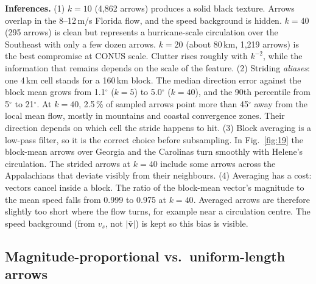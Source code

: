 \textbf{Inferences.}
(1) $k=10$ (4,862 arrows) produces a solid black texture. Arrows overlap in the 8--12\,m/s Florida flow, and the speed
background is hidden. $k=40$ (295 arrows) is clean but represents a hurricane-scale circulation over the Southeast with
only a few dozen arrows. $k=20$ (about 80\,km, 1,219 arrows) is the best compromise at CONUS scale. Clutter rises roughly
with $k^{-2}$, while the information that remains depends on the scale of the feature.
(2) Striding \emph{aliases}: one 4\,km cell stands for a 160\,km block. The median direction error against the block mean
grows from 1.1$^\circ$ ($k=5$) to 5.0$^\circ$ ($k=40$), and the 90th percentile from 5$^\circ$ to 21$^\circ$. At $k=40$,
2.5\,\% of sampled arrows point more than 45$^\circ$ away from the local mean flow, mostly in mountains and coastal
convergence zones. Their direction depends on which cell the stride happens to hit.
(3) Block averaging is a low-pass filter, so it is the correct choice before subsampling. In Fig.~\ref{fig:19} the
block-mean arrows over Georgia and the Carolinas turn smoothly with Helene's circulation. The strided arrows at $k=40$
include some arrows across the Appalachians that deviate visibly from their neighbours.
(4) Averaging has a cost: vectors cancel inside a block. The ratio of the block-mean vector's magnitude to the mean
speed falls from 0.999 to 0.975 at $k=40$. Averaged arrows are therefore slightly too short where the flow turns,
for example near a circulation centre. The speed background (from $v_s$, not $|\bar{\mathbf{v}}|$) is kept so this bias
is visible.

\subsection{Magnitude-proportional vs.\ uniform-length arrows}

